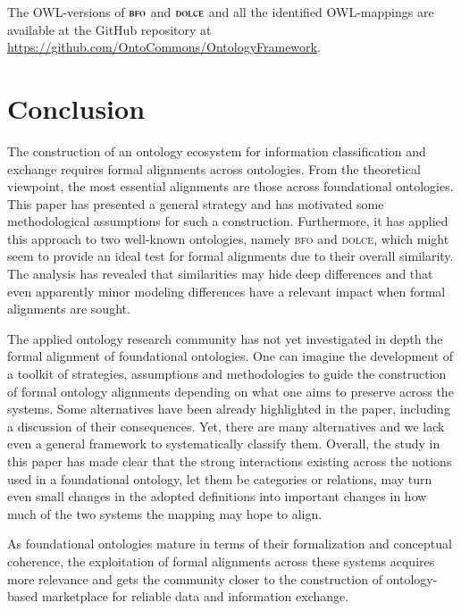 \documentclass[ao]{iosart2x}
\newcommand{\nb}[1]{\textcolor{red}{$|$}\marginpar{\hspace*{-0cm}\parbox{20mm}{\scriptsize\raggedright\textcolor{red}{#1}}}}
\newcommand{\dolce}{{\textsc{dolce}}}
\newcommand{\bfo}{{\textsc{bfo}}}
\begin{document}
The OWL-versions of $\bfo$ and $\dolce$ and all the identified OWL-mappings are available at the GitHub repository at \url{https://github.com/OntoCommons/OntologyFramework}.  


\section{Conclusion}\label{sect_conclusion}
The construction of an ontology ecosystem for information classification and exchange requires formal alignments across ontologies. From the theoretical viewpoint, the most essential alignments are those across foundational ontologies. This paper has presented a general strategy and has motivated some methodological assumptions for such a construction.
Furthermore, it has applied this approach to two well-known ontologies, namely {\bfo} and {\dolce}, which might seem to provide an ideal test for formal alignments due to their overall similarity. The analysis has revealed that similarities may hide deep differences and that even apparently minor modeling differences have a relevant impact when formal alignments are sought.

The applied ontology research community has not yet investigated in depth the formal alignment of foundational ontologies. One can imagine the development of a toolkit of strategies, assumptions and methodologies to guide the construction of formal ontology alignments depending on what one aims to preserve across the systems. Some alternatives have been already highlighted in the paper, including a discussion of their consequences. Yet, there are many alternatives and we lack even a general framework to systematically classify them. 
Overall, the study in this paper has made clear that the strong interactions existing across the notions used in a foundational ontology, let them be categories or relations, may turn even small changes in the adopted definitions into important changes in how much of the two systems the mapping may hope to align.

As foundational ontologies mature in terms of their formalization and conceptual coherence, the exploitation of formal alignments across these systems acquires more relevance and gets the community closer to the construction of ontology-based marketplace for reliable data and information exchange.
\end{document}
